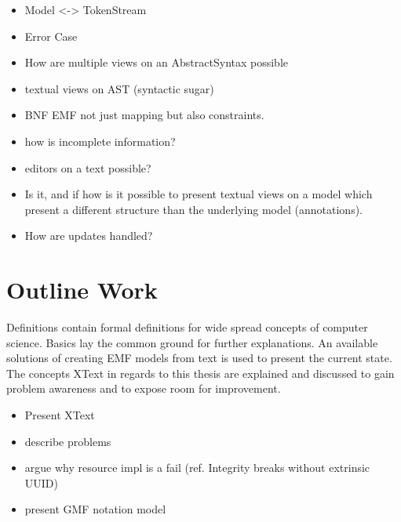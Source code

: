 \begin{itemize}
	\item  Model <-> TokenStream
	\item  Error Case
\end{itemize}


\begin{itemize}
	\item How are multiple views on an AbstractSyntax possible
	\item textual views on AST (syntactic sugar)
	\item BNF EMF not just mapping but also constraints.
	\item how is incomplete information?
	\item editors on a text possible?
	\item Is it, and if how is it possible to present textual views on a model which present a different structure than the underlying model (annotations).
		\item  How are updates handled?
\end{itemize}


\section{Outline Work}
Definitions contain formal definitions for wide spread concepts of computer science. Basics lay the common ground for further explanations. An available solutions of creating EMF models from text is used to present the current state. The concepts XText in regards to this thesis are explained and discussed to gain problem awareness and to expose room for improvement. 


\begin{itemize} 
	\item Present XText
	\item describe problems
	\item argue why resource impl is a fail (ref. Integrity breaks without extrinsic  UUID)
	\item present GMF notation model
\end{itemize}